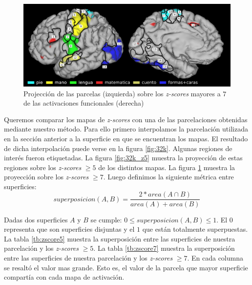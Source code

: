 \begin{figure}[h!]
    \includegraphics[width=\textwidth]{img/32k_z7.png}
    \caption{Projecci\'on de las parcelas (izquierda) sobre los \textit{z-scores}
    mayores a $7$ de las activaciones funcionales (derecha)}
    \label{fig:32k_z7}
\end{figure}


Queremos comparar los mapas de \textit{z-scores} con una de las 
parcelaciones obtenidas mediante nuestro m\'etodo. Para ello primero
interpolamos la parcelaci\'on utilizada en la secci\'on anterior a la
superficie en que se encuentran los mapas. El resultado de dicha 
interpolaci\'on puede verse en la figura \ref{fig:32k}. Algunas regiones
de inter\'es fueron etiquetadas. La figura \ref{fig:32k_z5} muestra la
proyecci\'on de estas regiones sobre los \textit{z-scores} $ \geq 5$ de
los distintos mapas. La figura \ref{fig:32k_z7} muestra la proyecci\'on
sobre los \textit{z-scores} $ \geq 7$. Luego definimos la siguiente 
m\'etrica entre superficies: \\

$$ superposicion(A,B) = \frac{ 2 * area(A \cap B) }{area(A) + area(B)} $$ 
 
Dadas dos superficies $A$ y $B$ se cumple: 
$0 \leq superposicion(A,B) \leq 1$. El $0$ representa que son superficies
disjuntas y el $1$ que est\'an totalmente superpuestas. La tabla 
\ref{tb:zscore5} muestra la superposici\'on entre las superficies de 
nuestra parcelaci\'on y los \textit{z-scores} $ \geq 5$.  La tabla 
\ref{tb:zscore7} muestra la superposici\'on entre las superficies de 
nuestra parcelaci\'on y los \textit{z-scores} $ \geq 7$. En cada columna
se resalt\'o el valor mas grande. Esto es, el valor de la parcela que
mayor superficie compart\'ia con cada mapa de activaci\'on.  \\
 
